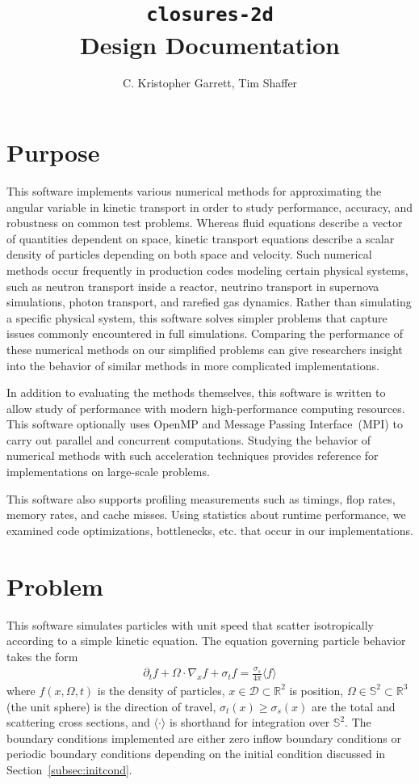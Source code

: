 \documentclass{article}
\title{\texttt{closures-2d} \\ Design Documentation}
\author{C. Kristopher Garrett, Tim Shaffer}
\newcommand{\integral}[1]{\ensuremath{\langle #1 \rangle}}
\newcommand{\twosphere}{\ensuremath{\mathbb{S}^2}\xspace}
\newcommand{\threespace}{\ensuremath{\mathbb{R}^3}\xspace}
\begin{document}
\maketitle
\tableofcontents

\section{Purpose}
This software implements various numerical methods for
approximating the angular variable in kinetic transport in order
to study performance, accuracy, and robustness on common test problems.
Whereas fluid equations describe a vector of quantities dependent on space,
kinetic transport equations describe a scalar density of particles
depending on both space and velocity. Such numerical methods occur
frequently in production codes modeling certain physical systems, such as
neutron transport inside a reactor, neutrino transport in supernova simulations,
photon transport, and rarefied gas dynamics. Rather than simulating a
specific physical system, this software solves simpler problems that capture
issues commonly encountered in full simulations. Comparing the performance of
these numerical methods on our simplified problems can give researchers
insight into the behavior of similar methods in more complicated
implementations.

In addition to evaluating the methods themselves, this
software is written to allow study of
performance with modern high-performance computing resources. This software
optionally uses OpenMP and Message Passing Interface~(MPI) to carry
out parallel and concurrent computations. Studying the behavior of
numerical methods with such acceleration techniques provides reference for
implementations on large-scale problems.

This software also supports profiling measurements such as timings, flop rates,
memory rates, and cache misses. Using statistics about runtime performance,
we examined code optimizations, bottlenecks, etc. that occur
in our implementations.

\section{Problem}
This software simulates particles with unit speed that scatter isotropically according to a simple kinetic equation. 
The equation governing particle behavior takes the form
\begin{align}
    \label{eqn:kinetic}
    \partial_t f + \Omega \cdot \nabla_x f + \sigma_t f =
    \frac{\sigma_s}{4\pi} \integral{f}
\end{align}
where $f(x,\Omega,t)$ is the density of particles, $x \in \mathcal{D} \subset \mathbb{R}^2$ is position, $\Omega \in \twosphere \subset \threespace$ (the unit sphere)
is the direction of travel, $\sigma_t(x) \geq \sigma_s(x)$ are the total and scattering cross sections, and
\integral{\cdot} is shorthand for integration over \twosphere.
The boundary conditions implemented are either zero inflow boundary conditions or periodic boundary conditions depending on the initial condition discussed in Section~\ref{subsec:initcond}.
\end{document}

